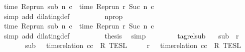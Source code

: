 \begin{isabellebody}
\ {\isacartoucheopen}time\ {\isacharparenleft}{\isacharparenleft}Rep{\isacharunderscore}run\ sub{\isacharparenright}\ n\ c\ {\isacharequal}\ time\ {\isacharparenleft}{\isacharparenleft}Rep{\isacharunderscore}run\ r{\isacharparenright}\ {\isacharparenleft}Suc\ n{\isacharparenright}\ c\isanewline
\ \ \ \ \ \ \ \ \isamarkupfalse%
\ {\isacharparenleft}simp\ add{\isacharcolon}\ dilating{\isacharunderscore}def{\isacharparenright}\isanewline
\ \ \ \ \ \ \isamarkupfalse%
\ \isamarkupfalse%
\ nprop\ {\isacharasterisk}\ \isamarkupfalse%
\ {\isacartoucheopen}time\ {\isacharparenleft}{\isacharparenleft}Rep{\isacharunderscore}run\ sub{\isacharparenright}\ n\ c\ {\isacharequal}\ time\ {\isacharparenleft}{\isacharparenleft}Rep{\isacharunderscore}run\ r{\isacharparenright}\ {\isacharparenleft}Suc\ n{\isacharparenright}\ c\isanewline
\ \ \ \ \ \ \ \ \isamarkupfalse%
\ {\isacharparenleft}simp\ add{\isacharcolon}\ dilating{\isacharunderscore}def{\isacharparenright}\isanewline
\ \ \ \ \ \ \isamarkupfalse%
\ \isamarkupfalse%
\ {\isacharquery}thesis\ \isamarkupfalse%
\ simp\isanewline
\ \ \ \ \isamarkupfalse%
\isanewline
\ \ \isamarkupfalse%
\isanewline
{}\isamarkupfalse%
%
\endisatagproof
{\isafoldproof}%
%
\isadelimproof
\isanewline
%
\endisadelimproof
\isanewline
{}\isamarkupfalse%
\ tagrel{\isacharunderscore}sub{\isacharcolon}\isanewline
\ \ \ {\isacartoucheopen}sub\ {\isasymlless}\ r{\isacartoucheclose}\isanewline
\ \ \ \ \ \ \ {\isacartoucheopen}sub\ {\isasymin}\ {\isasymlbrakk}\ time{\isacharminus}relation\ {\isasymlfloor}cc\ {\isasymin}\ R\ {\isasymrbrakk}\isactrlsub T\isactrlsub E\isactrlsub S\isactrlsub L{\isacartoucheclose}\isanewline
\ \ \ \ \ {\isacartoucheopen}r\ {\isasymin}\ {\isasymlbrakk}\ time{\isacharminus}relation\ {\isasymlfloor}cc\ {\isasymin}\ R\ {\isasymrbrakk}\isactrlsub T\isactrlsub E\isactrlsub S\isactrlsub L{\isacartoucheclose}\isanewline

\end{isabellebody}
